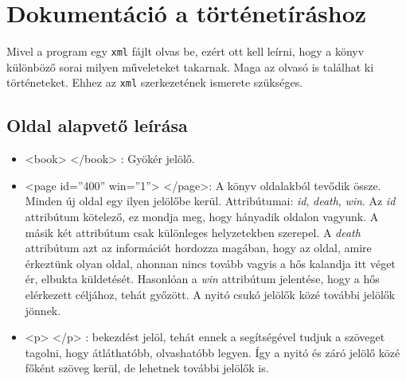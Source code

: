\documentclass[12pt,a4paper,oneside]{report}
\newcommand{\attr}{\emph}
\newcommand{\proglang}{\texttt}
\begin{document}
  \section{Dokumentáció a történetíráshoz}
    Mivel a program egy \proglang{xml} fájlt olvas be, ezért ott kell
    leírni, hogy a könyv különböző sorai milyen műveleteket
    takarnak. Maga az olvasó is találhat ki történeteket. Ehhez az
    \proglang{xml} szerkezetének ismerete szükséges.

    \subsection{Oldal alapvető leírása}
      \begin{itemize}
        \item <{\color{Tag}book}> <{\color{Tag}/book}> : Gyökér jelölő.

        \item <{\color{Tag}page}
          {\color{Attr}id}={\color{Value}''400''}
          {\color{Attr}win}={\color{Value}''1''}>
          <{\color{Tag}/page}>: A könyv oldalakból tevődik
          össze. Minden új oldal egy ilyen jelölőbe
          kerül. Attribútumai: \attr{id}, \attr{death}, \attr{win}.
          Az \attr{id} attribútum kötelező, ez mondja meg, hogy
          hányadik oldalon vagyunk. A másik két attribútum csak
          különleges helyzetekben szerepel. A \attr{death} attribútum
          azt az információt hordozza magában, hogy az oldal, amire
          érkeztünk olyan oldal, ahonnan nincs tovább vagyis a hős
          kalandja itt véget ér, elbukta küldetését. Hasonlóan a
          \attr{win} attribútum jelentése, hogy a hős elérkezett
          céljához, tehát győzött. A nyitó csukó jelölők közé további
          jelölők jönnek.
          
        \item <{\color{Tag}p}> <{\color{Tag}/p}> : bekezdést jelöl, tehát ennek a
          segítségével tudjuk a szöveget tagolni, hogy átláthatóbb,
          olvashatóbb legyen. Így a nyitó és záró jelölő közé főként
          szöveg kerül, de lehetnek további jelölők is.
      \end{itemize}
      
\end{document}
